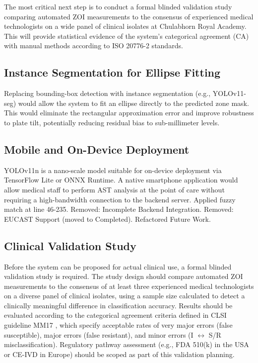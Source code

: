 The most critical next step is to conduct a formal blinded validation study comparing automated ZOI measurements to the consensus of experienced medical technologists on a wide panel of clinical isolates at Chulabhorn Royal Academy.
This will provide statistical evidence of the system's categorical agreement (CA) with manual methods according to ISO 20776-2 standards.

\subsection{Instance Segmentation for Ellipse Fitting}

Replacing bounding-box detection with instance segmentation (e.g., YOLOv11-seg) would allow the system to fit an ellipse directly to the predicted zone mask.
This would eliminate the rectangular approximation error and improve robustness to plate tilt, potentially reducing residual bias to sub-millimeter levels.

\subsection{Mobile and On-Device Deployment}

YOLOv11n is a nano-scale model suitable for on-device deployment via TensorFlow Lite or ONNX Runtime.
A native smartphone application would allow medical staff to perform AST analysis at the point of care without requiring a high-bandwidth connection to the backend server.
Applied fuzzy match at line 46-235.
Removed: Incomplete Backend Integration.
Removed: EUCAST Support (moved to Completed).
Refactored Future Work.

\subsection{Clinical Validation Study}

Before the system can be proposed for actual clinical use,
a formal blinded validation study is required.
The study design should compare automated ZOI measurements to the consensus of
at least three experienced medical technologists on a diverse panel of clinical isolates,
using a sample size calculated to detect a clinically meaningful difference in classification accuracy.
Results should be evaluated according to the categorical agreement criteria
defined in CLSI guideline MM17 \cite{clsi2025},
which specify acceptable rates of very major errors (false susceptible),
major errors (false resistant), and minor errors (I $\leftrightarrow$ S/R misclassification).
Regulatory pathway assessment (e.g., FDA 510(k) in the USA or CE-IVD in Europe)
should be scoped as part of this validation planning.

